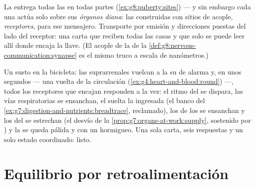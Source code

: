 \begin{proposition}\label{prop:g8:hormonal-communication:address}
La  entrega todas las  en todas partes
(\cref{ex:g8:puberty:sites}) --- y sin embargo cada una actúa solo
sobre sus \emph{órganos diana}: las 
construidas con sitios de acople, \emph{receptores}, para ese
mensajero. Transporte por emisión y direcciones puestas del lado del
receptor: una carta que reciben todas las casas y que solo se puede
leer allí donde encaja la llave. (El acople de la  de la
\cref{def:g8:nervous-communication:synapse} es el mismo truco a escala
de nanómetros.)
\end{proposition}
\admitted

\begin{example}\label{ex:g8:hormonal-communication:alarm}
Un susto en la bicicleta: las  suprarrenales vuelcan a la
 su  de alarma y, en unos segundos --- una vuelta de la
circulación (\cref{ex:g4:heart-and-blood:round}) ---, todos los
receptores que encajan responden a la vez: el ritmo del  se
dispara, las vías respiratorias se ensanchan, el  suelta la
 ingresada (el banco del
\cref{ex:g7:digestion-and-nutrients:breadtrace}, reclamado), los 
de los  se ensanchan y los del  se estrechan (el
desvío de la \cref{prop:g7:organs-at-work:supply}, sostenido por
) y la  se queda pálida y con un hormigueo. Una sola carta,
seis respuestas y un solo estado coordinado: listo.
\end{example}

\section{Equilibrio por retroalimentación}

